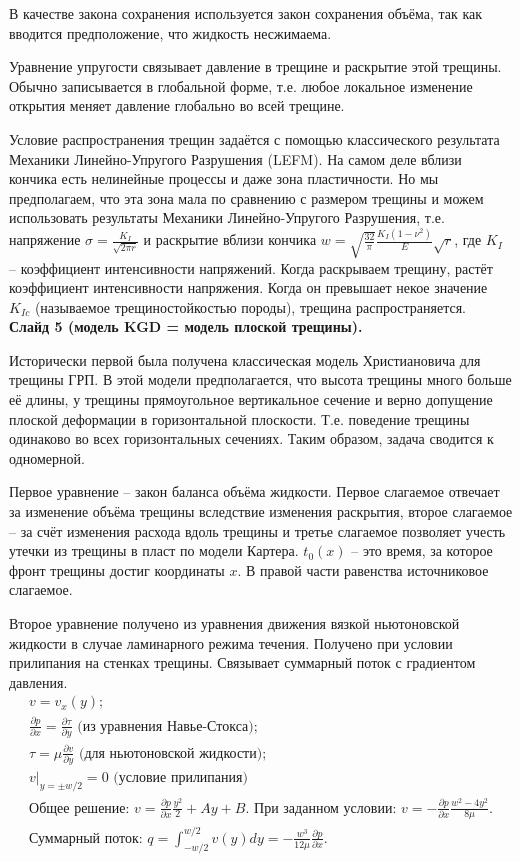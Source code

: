 \documentclass[a4paper, 12pt]{article}
\newcommand{\beq}{\begin{equation}}
\newcommand{\eeq}{\end{equation}}
\begin{document}
В качестве закона сохранения используется закон сохранения объёма, так как вводится предположение, что жидкость несжимаема.

Уравнение упругости связывает давление в трещине и раскрытие этой трещины.
Обычно записывается в глобальной форме, т.е. любое локальное изменение открытия меняет давление глобально во всей трещине.

Условие распространения трещин задаётся с помощью классического результата Механики Линейно-Упругого Разрушения (LEFM).
На самом деле вблизи кончика есть нелинейные процессы и даже зона пластичности.
Но мы предполагаем, что эта зона мала по сравнению с размером трещины и можем использовать результаты Механики Линейно-Упругого Разрушения, т.е. напряжение $\sigma=\frac{K_I}{\sqrt{2\pi r}}$ и раскрытие вблизи кончика $w=\sqrt{\frac{32}{\pi}}\frac{K_{I}\left(1-\nu^2\right)}{E}\sqrt{r}$, где $K_I$ -- коэффициент интенсивности напряжений.
Когда раскрываем трещину, растёт коэффициент интенсивности напряжения.
Когда он превышает некое значение $K_{Ic}$ (называемое трещиностойкостью породы), трещина распространяется.\\

\textbf{Слайд 5 (модель KGD = модель плоской трещины).}

Исторически первой была получена классическая модель Христиановича для трещины ГРП.
В этой модели предполагается, что высота трещины много больше её длины, у трещины прямоугольное вертикальное сечение и верно допущение плоской деформации в горизонтальной плоскости.
Т.е. поведение трещины одинаково во всех горизонтальных сечениях.
Таким образом, задача сводится к одномерной.

Первое уравнение -- закон баланса объёма жидкости.
Первое слагаемое отвечает за изменение объёма трещины вследствие изменения раскрытия, второе слагаемое -- за счёт изменения расхода вдоль трещины и третье слагаемое позволяет учесть утечки из трещины в пласт по модели Картера.
$t_0(x)$ -- это время, за которое фронт трещины достиг координаты $x$.
В правой части равенства источниковое слагаемое.

Второе уравнение получено из уравнения движения вязкой ньютоновской жидкости в случае ламинарного режима течения.
Получено при условии прилипания на стенках трещины.
Связывает суммарный поток с градиентом давления.
\beq
\begin{gathered}
v=v_x(y);\\
\frac{\partial p}{\partial x}=\frac{\partial\tau}{\partial y}\text{ (из уравнения Навье-Стокса)};\\
\tau=\mu\frac{\partial v}{\partial y}\text{ (для ньютоновской жидкости)};\\
v|_{y=\pm w/2}=0\text{ (условие прилипания)}\\
\text{Общее решение: }v=\frac{\partial p}{\partial x}\frac{y^2}{2}+Ay+B.\text{ При заданном условии: }v=-\frac{\partial p}{\partial x}\frac{w^2-4y^2}{8\mu}.\\
\text{Суммарный поток: }q=\int_{-w/2}^{w/2}{v(y)}dy=-\frac{w^3}{12\mu}\frac{\partial p}{\partial x}.
\end{gathered}
\eeq
\end{document}
